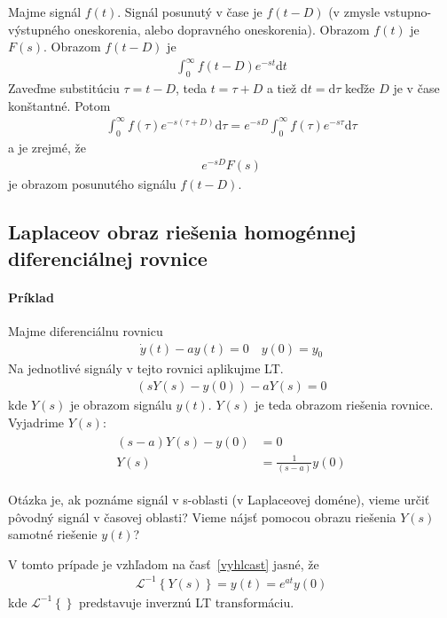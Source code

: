\documentclass[a4paper, 10pt, ]{article}
\begin{document}
Majme signál $f(t)$. Signál posunutý v čase je $f(t-D)$ (v zmysle vstupno-výstupného oneskorenia, alebo dopravného oneskorenia). Obrazom $f(t)$ je $F(s)$. Obrazom $f(t-D)$ je
\begin{align}
    \int_0^\infty f(t-D) e^{-st} \text{d}t
\end{align}
Zaveďme substitúciu $\tau  = t-D$, teda $t=\tau+D$ a tiež $\text{d}t = \text{d}\tau$ keďže $D$ je v čase konštantné. Potom
\begin{align}
    \int_0^\infty f(\tau) e^{-s(\tau+D)} \text{d}\tau = e^{-sD} \int_0^\infty f(\tau) e^{-s\tau} \text{d}\tau
\end{align}
a je zrejmé, že
\begin{align}
    e^{-sD} F(s)
\end{align}
je obrazom posunutého signálu $f(t-D)$.





\subsection{Laplaceov obraz riešenia homogénnej diferenciálnej rovnice}

\paragraph{Príklad}

Majme diferenciálnu rovnicu
\begin{align}  \label{prrov}
    \dot y(t) - a y(t) = 0 \quad y(0) = y_0
\end{align}
Na jednotlivé signály v tejto rovnici aplikujme LT.
\begin{align}
    \left( s Y(s) - y(0)  \right) - a Y(s) = 0
\end{align}
kde $Y(s)$ je obrazom signálu $y(t)$. $Y(s)$ je teda obrazom riešenia rovnice. Vyjadrime $Y(s)$:
\begin{align}
    \begin{aligned}
        (s-a)Y(s) - y(0) &= 0 \\
        Y(s) &= \frac{1}{(s-a)} y(0)
    \end{aligned}
\end{align}

Otázka je, ak poznáme signál v s-oblasti (v Laplaceovej doméne), vieme určiť pôvodný signál v časovej oblasti? Vieme nájsť pomocou obrazu riešenia $Y(s)$ samotné riešenie $y(t)$?

V tomto prípade je vzhľadom na časť~\ref{vyhlcast} jasné, že
\begin{align} \label{prries}
    \mathcal L ^{-1} \left\{ Y(s) \right\} = y(t) = e^{at}y(0)
\end{align}
kde $\mathcal L ^{-1} \left\{  \right\}$ predstavuje  inverznú LT transformáciu.
\end{document}
